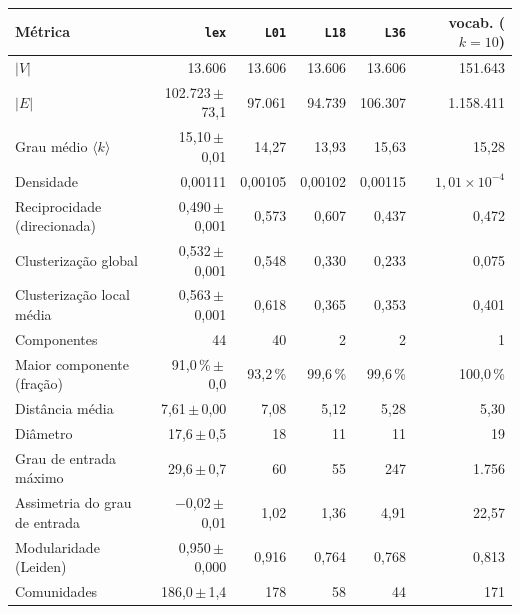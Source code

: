 \footnotesize
\begin{tabular}{lrrrrr}
\toprule
Métrica & \texttt{lex} & \texttt{L01} & \texttt{L18} & \texttt{L36} & vocab. ($k=10$) \\
\midrule
$|V|$ & 13.606 & 13.606 & 13.606 & 13.606 & 151.643 \\
$|E|$ & 102.723\,$\pm$\,73,1 & 97.061 & 94.739 & 106.307 & 1.158.411 \\
Grau médio $\langle k\rangle$ & 15,10\,$\pm$\,0,01 & 14,27 & 13,93 & 15,63 & 15,28 \\
Densidade & 0,00111 & 0,00105 & 0,00102 & 0,00115 & $1{,}01\times10^{-4}$ \\
Reciprocidade (direcionada) & 0,490\,$\pm$\,0,001 & 0,573 & 0,607 & 0,437 & 0,472 \\
Clusterização global & 0,532\,$\pm$\,0,001 & 0,548 & 0,330 & 0,233 & 0,075 \\
Clusterização local média & 0,563\,$\pm$\,0,001 & 0,618 & 0,365 & 0,353 & 0,401 \\
Componentes & 44 & 40 & 2 & 2 & 1 \\
Maior componente (fração) & 91,0\,\%\,$\pm$\,0,0 & 93,2\,\% & 99,6\,\% & 99,6\,\% & 100,0\,\% \\
Distância média & 7,61\,$\pm$\,0,00 & 7,08 & 5,12 & 5,28 & 5,30 \\
Diâmetro & 17,6\,$\pm$\,0,5 & 18 & 11 & 11 & 19 \\
Grau de entrada máximo & 29,6\,$\pm$\,0,7 & 60 & 55 & 247 & 1.756 \\
Assimetria do grau de entrada & $-$0,02\,$\pm$\,0,01 & 1,02 & 1,36 & 4,91 & 22,57 \\
Modularidade (Leiden) & 0,950\,$\pm$\,0,000 & 0,916 & 0,764 & 0,768 & 0,813 \\
Comunidades & 186,0\,$\pm$\,1,4 & 178 & 58 & 44 & 171 \\
\bottomrule
\end{tabular}

